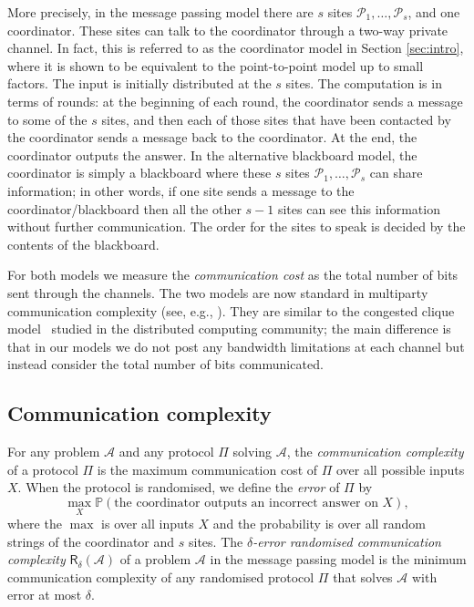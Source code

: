 More precisely, in the message passing model there are $s$ sites $\mathcal{P}_1,\ldots, \mathcal{P}_s$, and one coordinator. These sites can talk to the coordinator through a two-way private channel. In fact, this is referred to as the coordinator model in Section \ref{sec:intro}, where it is shown to be equivalent to the point-to-point model up to small factors. The input is initially distributed at the $s$ sites. The computation is in terms of rounds: at the beginning of each round, the coordinator sends a message to some of the $s$ sites, and then each of those sites that have been contacted by the coordinator sends a message back to the coordinator.  At the end, the coordinator outputs the answer.   In the alternative blackboard model, the coordinator is simply a blackboard where these $s$ sites $\mathcal{P}_1,\ldots, \mathcal{P}_s$ can share information; in other words, if one site sends a message to the coordinator/blackboard then all the other $s-1$ sites can see this information without further communication. The order for the sites to speak is decided by the contents of the blackboard.

For both models we measure the \emph{communication cost} as the total number of bits sent through the channels.  %
The two models are now standard in multiparty communication complexity (see, e.g., \cite{beopv13,pvz16,wz12}).  They are similar to the congested clique model~\cite{LPPP03}  studied in the distributed computing community; the main difference is that in our models we do not post any bandwidth limitations at each channel but instead consider the total number of bits communicated.




\subsection{Communication complexity}  For any problem $\mathcal{A}$ and any protocol $\Pi$ solving $\mathcal{A}$, the \emph{communication complexity} of a protocol $\Pi$ is the maximum communication cost of $\Pi$ over all possible inputs $X$.  When the protocol is randomised, we define 
the \emph{error} of $\Pi$   by 
\[
\max_X\mathbb{P}\left(\mbox{the coordinator outputs an incorrect answer on $X$}\right),
\]
where the $\max$ is over all inputs $X$ and the probability is over all random strings of the coordinator and $s$ sites.
 The \emph{$\delta$-error randomised communication complexity} $\mathsf{R}_{\delta}(\mathcal{A})$ of a problem $\mathcal{A}$ in the message passing model  is the minimum communication complexity of any randomised protocol $\Pi$ that solves $\mathcal{A}$ with error at most $\delta$.  
 

